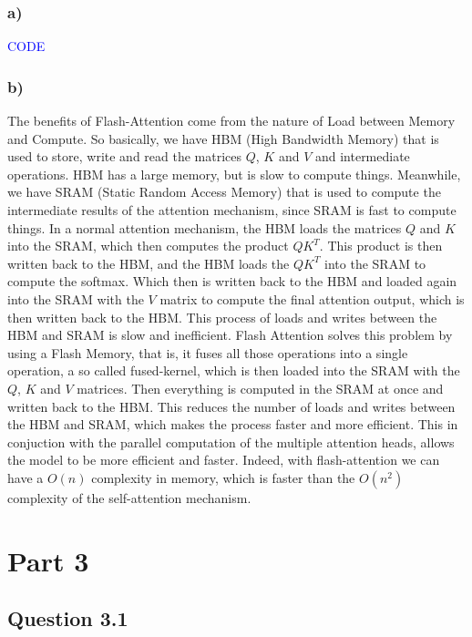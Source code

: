 \documentclass{article}
\begin{document}
\subsubsection*{a)}

\textcolor{blue}{CODE}

\subsubsection*{b)}

The benefits of Flash-Attention come from the nature of Load between Memory and Compute. So basically, we have HBM (High Bandwidth Memory)
that is used to store, write and read the matrices $Q$, $K$ and $V$ and intermediate operations. HBM has a large memory, but is slow to compute things. Meanwhile, we have
SRAM (Static Random Access Memory) that is used to compute the intermediate results of the attention mechanism, since SRAM is fast to compute things.
In a normal attention mechanism, the HBM loads the matrices $Q$ and $K$ into the SRAM, which then computes the product $QK^T$. 
This product is then written back to the HBM, and the HBM loads the $QK^T$ into the SRAM to compute the softmax. Which then
is written back to the HBM and loaded again into the SRAM with the $V$ matrix to compute the final attention output, which is then written
back to the HBM. This process of loads and writes between the HBM and SRAM is slow and inefficient.
Flash Attention solves this problem by using a Flash Memory, that is, it fuses all those operations into a single operation,
a so called fused-kernel, which is then loaded into the SRAM with the $Q$, $K$ and $V$ matrices. Then everything is computed in the SRAM
at once and written back to the HBM. This reduces the number of loads and writes between the HBM and SRAM, which makes the process
faster and more efficient.
This in conjuction with the parallel computation of the multiple attention heads, allows the model to be more efficient and faster. Indeed,
with flash-attention we can have a $O(n)$ complexity in memory, which is faster than the $O(n^2)$ complexity of the self-attention mechanism.

\newpage

\section*{Part 3}

\subsection*{Question 3.1}
\end{document}
